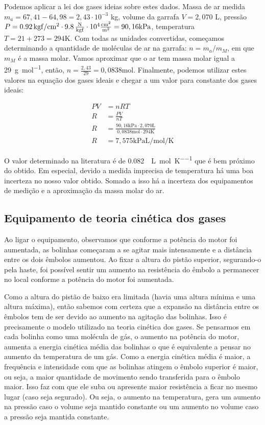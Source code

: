 Podemos aplicar a lei dos gases ideias sobre estes dados. Massa de ar medida \(m_a = 67,41 - 64,98 = 2,43 \cdot 10^{-3}\) \si{kg}, volume da garrafa \(V = 2,070\) \si{\liter}, pressão \(P = \qty{0,92}{\kilo\gram f \per\centi\meter^2} \cdot \qty{9,8}{\frac{\newton}{\kilo\gram f}}  \cdot 10^4\si{\frac{\centi\meter^2}{\meter^2}} = 90,16\si{\kilo\pascal}\), temperatura \(T = 21 + 273 = 294\si{\kelvin}\). Com todas as unidades convertidas, começamos determinando a quantidade de moléculas de ar na garrafa: \(n = m_a/m_M\), em que \(m_M\) é a massa molar. Vamos aproximar que o ar tem massa molar igual a \qty{29}{\gram\per\mole}, então, \(n = \frac{2,43}{29} = 0,0838 \si{\mole}\). Finalmente, podemos utilizar estes valores na equação dos gases ideais e chegar a um valor para constante dos gases ideais:

\begin{align*}
    PV &= nRT\\
    R &= \frac{PV}{nT}\\
    R &= \frac{90,16 \si{\kilo\pascal} \cdot 2,070 \si{\liter}}{0,0838 \si{\mole} \cdot 294 \si{\kelvin}}\\
    R &= 7,575 \si{\kilo\pascal\liter\per\mole\per\kelvin} 
\end{align*}

O valor determinado na literatura é de \qty{0,082}{\atm\liter\per\mole\per\kelvin} que é bem próximo do obtido. Em especial, devido a medida imprecisa de temperatura há uma boa incerteza no nosso valor obtido. Somado a isso há a incerteza dos equipamentos de medição e a aproximação da massa molar do ar.

\subsection{Equipamento de teoria cinética dos gases}

Ao ligar o equipamento, observamos que conforme a potência do motor foi aumentada, as bolinhas começaram a se agitar mais intensamente e a distância entre os dois êmbolos aumentou. Ao fixar a altura do pistão superior, segurando-o pela haste, foi possível sentir um aumento na resistência do êmbolo a permanecer no local conforme a potência do motor foi aumentada. 

Como a altura do pistão de baixo era limitada (havia uma altura mínima e uma altura máxima), então sabemos com certeza que a expansão na distância entre os êmbolos tem de ser devido ao aumento na agitação das bolinhas. Isso é precisamente o modelo utilizado na teoria cinética dos gases. Se pensarmos em cada bolinha como uma molécula de gás, o aumento na potência do motor, aumenta a energia cinética média das bolinhas o que é equivalente a pensar no aumento da temperatura de um gás. Como a energia cinética média é maior, a frequência e intensidade com que as bolinhas atingem o êmbolo superior é maior, ou seja, a maior quantidade de movimento sendo transferida para o êmbolo maior. Isso faz com que ele suba ou apresente maior resistência a ficar no mesmo lugar (caso seja segurado). Ou seja, o aumento na temperatura, gera um aumento na pressão caso o volume seja mantido constante ou um aumento no volume caso a pressão seja mantida constante. 
